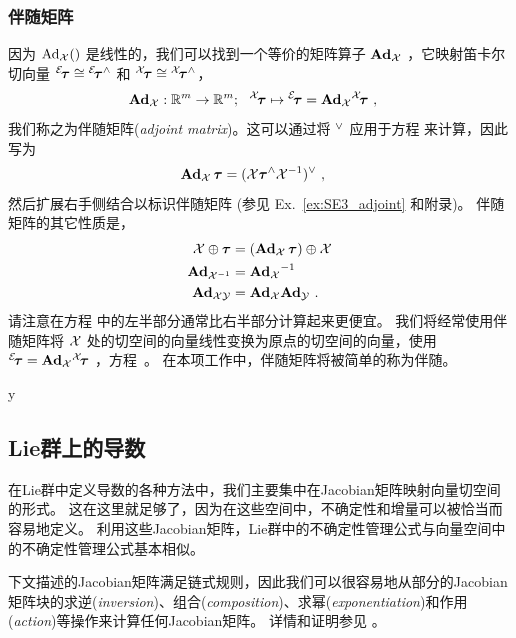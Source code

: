 \subsubsection{伴随矩阵}
因为 $\Adh{\cX}()$ 是线性的，我们可以找到一个等价的矩阵算子 $\Ad{\cX}$ ，它映射笛卡尔切向量 ${^\cE}\!\bftau\cong{^\cE}\!\bftau\hhat$ 和 ${^\cX}\!\bftau\cong{^\cX}\!\bftau\hhat$，
%
\begin{align}
\Ad{\cX}:\bbR^m\to\bbR^m;~~ ^\cX\!\bftau\mapsto {^\cE}\!\bftau &= \Ad[\cM]{\cX}{^\cX}\!\bftau \label{equ:Adj2} 
~,
\end{align}
%
我们称之为伴随矩阵(\emph{adjoint matrix})。这可以通过将 $\vvee$ 应用于方程  来计算，因此写为
%
\begin{align}\label{equ:Adj4} 
\Ad[\cM]{\cX}\,\bftau &= (\cX\bftau\hhat\cX\inv)\vvee 
~,
\end{align}
%
然后扩展右手侧结合以标识伴随矩阵 (参见 Ex.~\ref{ex:SE3_adjoint} 和附录)。
伴随矩阵的其它性质是，
%
\begin{align}
\cX\op\bftau &= (\Ad[\cM]{\cX}\,\bftau)\op\cX \label{equ:Adj1} \\
\Ad[\cM]{\cX\inv} &= \Ad[\cM]{\cX}\inv \label{equ:Adj5} \\
\Ad[\cM]{\cX\cY} &=\Ad[\cM]{\cX}\Ad[\cM]{\cY} \label{equ:Adj7}
~.
\end{align}
%
请注意在方程  中的左半部分通常比右半部分计算起来更便宜。
我们将经常使用伴随矩阵将 $\cX$ 处的切空间的向量线性变换为原点的切空间的向量，使用 ${^\cE}\!\bftau = \Ad{\cX}{^\cX}\!\bftau$ ，方程~。
在本项工作中，伴随矩阵将被简单的称为伴随。



\if\examples y

\fi




\subsection{Lie群上的导数}

在Lie群中定义导数的各种方法中，我们主要集中在Jacobian矩阵映射向量切空间的形式。 
这在这里就足够了，因为在这些空间中，不确定性和增量可以被恰当而容易地定义。
利用这些Jacobian矩阵，Lie群中的不确定性管理公式与向量空间中的不确定性管理公式基本相似。

下文描述的Jacobian矩阵满足链式规则，因此我们可以很容易地从部分的Jacobian矩阵块的求逆(\emph{inversion})、组合(\emph{composition})、求幂(\emph{exponentiation})和作用(\emph{action})等操作来计算任何Jacobian矩阵。
详情和证明参见  。


